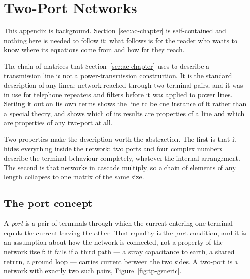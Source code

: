\section{Two-Port Networks}
\label{sec:two-port}

This appendix is background. Section~\ref{sec:ac-chapter} is self-contained
and nothing here is needed to follow it; what follows is for the reader who
wants to know where its equations come from and how far they reach.

The chain of matrices that Section~\ref{sec:ac-chapter} uses to describe a
transmission line is not a power-transmission construction. It is the
standard description of any linear network reached through two terminal
pairs, and it was in use for telephone repeaters and filters before it was
applied to power lines. Setting it out on its own terms shows the line to be
one instance of it rather than a special theory, and shows which of its
results are properties of a line and which are properties of any two-port at
all.

Two properties make the description worth the abstraction. The first is that
it hides everything inside the network: two ports and four complex numbers
describe the terminal behaviour completely, whatever the internal
arrangement. The second is that networks in cascade multiply, so a chain of
elements of any length collapses to one matrix of the same size.

\subsection{The port concept}
\label{sec:tp-ports}

A \emph{port} is a pair of terminals through which the current entering one
terminal equals the current leaving the other. That equality is the port
condition, and it is an assumption about how the network is connected, not a
property of the network itself: it fails if a third path --- a stray
capacitance to earth, a shared return, a ground loop --- carries current
between the two sides. A two-port is a network with exactly two such pairs,
Figure~\ref{fig:tp-generic}.

